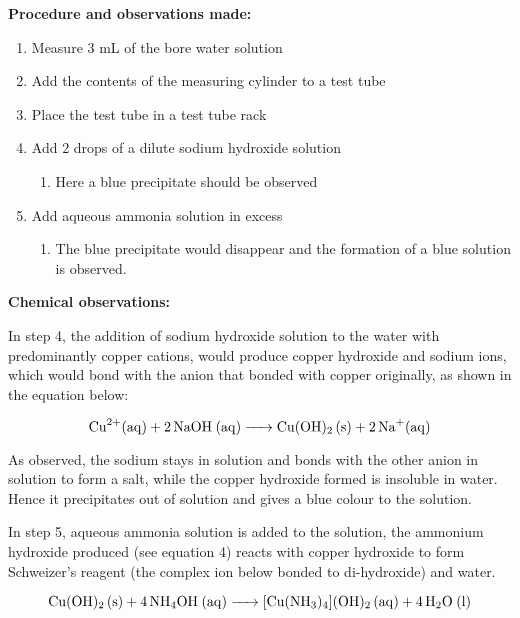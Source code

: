 \documentclass[11pt, a4]{article}
\begin{document}
			\noindent \textbf{Procedure and observations made:}

			\begin{enumerate}
				\item Measure 3 mL of the bore water solution
				\item Add the contents of the measuring cylinder to a test tube
				\item Place the test tube in a test tube rack
				\item Add 2 drops of a dilute sodium hydroxide solution
					\begin{enumerate}
						\item Here a blue precipitate should be observed
					\end{enumerate}
				\item Add aqueous ammonia solution in excess
					\begin{enumerate}
						\item The blue precipitate would disappear and the formation of a blue solution is observed.
					\end{enumerate}
			\end{enumerate}

			\noindent \textbf{Chemical observations:}

			In step 4, the addition of sodium hydroxide solution to the water with predominantly copper cations, would produce copper hydroxide and sodium ions, which would bond with the anion that bonded with copper originally, as shown in the equation below:

			\begin{equation}
				\ce{Cu^{2+}(aq) + 2NaOH (aq) -> Cu(OH)_2 (s) + 2Na^+(aq)}
			\end{equation}
 
			As observed, the sodium stays in solution and bonds with the other anion in solution to form a salt, while the copper hydroxide formed is insoluble in water. Hence it precipitates out of solution and gives a blue colour to the solution.

			In step 5, aqueous ammonia solution is added to the solution, the ammonium hydroxide produced (see equation 4) reacts with copper hydroxide to form Schweizer's reagent (the complex ion below bonded to di-hydroxide) and water.

			\begin{equation}
				\ce{Cu(OH)_2 (s) + 4NH_4OH (aq) -> [Cu(NH_3)_4](OH)_2 (aq) + 4H_2O (l)}
			\end{equation}
\end{document}
